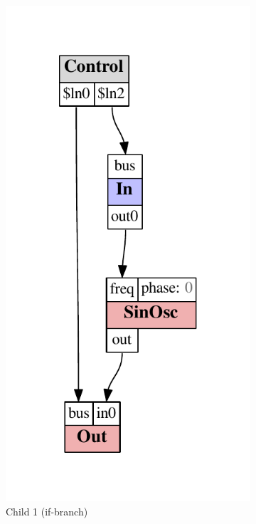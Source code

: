 \documentclass[11pt,a4paper]{article}
\begin{document}
\begin{figure}
\begin{subfigure}[b]{0.3\textwidth}
\includegraphics[scale=0.5]{figures/ugen-if-mod-child_1.pdf}
\caption{Child 1 (if-branch)}\label{fig:ugen-mod-c1}
\end{subfigure}
\begin{subfigure}[b]{0.3\textwidth}%

\end{subfigure}
\end{figure}
\end{document}
